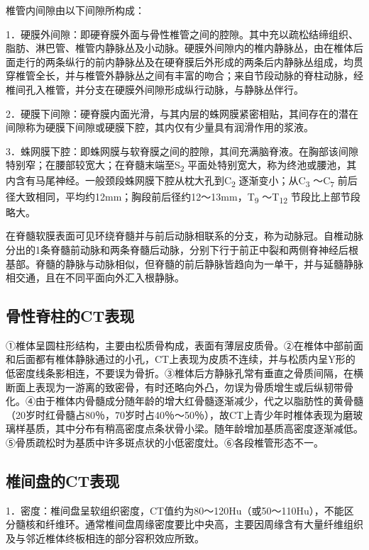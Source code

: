椎管内间隙由以下间隙所构成：

1．硬膜外间隙：即硬脊膜外面与骨性椎管之间的腔隙。其中充以疏松结缔组织、脂肪、淋巴管、椎管内静脉丛及小动脉。硬膜外间隙内的椎内静脉丛，由在椎体后面走行的两条纵行的前内静脉丛及在硬脊膜后外形成的两条后内静脉丛组成，均贯穿椎管全长，并与椎管外静脉丛之间有丰富的吻合；来自节段动脉的脊柱动脉，经椎间孔入椎管，并分支在硬膜外间隙形成纵行动脉，与静脉丛伴行。

2．硬膜下间隙：硬脊膜内面光滑，与其内层的蛛网膜紧密相贴，其间存在的潜在间隙称为硬膜下间隙或硬膜下腔，其内仅有少量具有润滑作用的浆液。

3．蛛网膜下腔：即蛛网膜与软脊膜之间的腔隙，其间充满脑脊液。在胸部该间隙特别窄；在腰部较宽大；在脊髓末端至S\textsubscript{2}
平面处特别宽大，称为终池或腰池，其内含有马尾神经。一般颈段蛛网膜下腔从枕大孔到C\textsubscript{2}
逐渐变小；从C\textsubscript{3} ～C\textsubscript{7}
前后径大致相同，平均约12mm；胸段前后径约12～13mm，T\textsubscript{9}
～T\textsubscript{12} 节段比上部节段略大。

在脊髓软膜表面可见环绕脊髓并与前后动脉相联系的分支，称为动脉冠。自椎动脉分出的1条脊髓前动脉和两条脊髓后动脉，分别下行于前正中裂和两侧脊神经后根基部。脊髓的静脉与动脉相似，但脊髓的前后静脉皆趋向为一单干，并与延髓静脉相交通，且在不同平面向外汇入根静脉。

\subsection{骨性脊柱的CT表现}

①椎体呈圆柱形结构，主要由松质骨构成，表面有薄层皮质骨。②在椎体中部前面和后面都有椎体静脉通过的小孔，CT上表现为皮质不连续，并与松质内呈Y形的低密度线条影相连，不要误为骨折。③椎体后方静脉孔常有垂直之骨质间隔，在横断面上表现为一游离的致密骨，有时还略向外凸，勿误为骨质增生或后纵韧带骨化。④由于椎体内骨髓成分随年龄的增大红骨髓逐渐减少，代之以脂肪性的黄骨髓（20岁时红骨髓占80％，70岁时占40％～50％），故CT上青少年时椎体表现为磨玻璃样基质，其中分布有稍高密度点条状骨小梁。随年龄增加基质高密度逐渐减低。⑤骨质疏松时为基质中许多斑点状的小低密度灶。⑥各段椎管形态不一。

\subsection{椎间盘的CT表现}

1．密度：椎间盘呈软组织密度，CT值约为80～120Hu（或50～110Hu），不能区分髓核和纤维环。通常椎间盘周缘密度要比中央高，主要因周缘含有大量纤维组织及与邻近椎体终板相连的部分容积效应所致。


